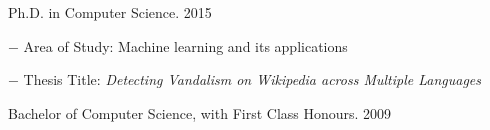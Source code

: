 \documentclass[10pt]{article}
\newcommand{\halfblankline}{\quad\vspace{-0.5\baselineskip}\pagebreak[3]}
\begin{document}
\begin{outerlist}
\item Ph.D. in Computer Science. \hfill 2015
	\begin{innerlist}
		\item[$-$] Area of Study: Machine learning and its applications
		\item[$-$] Thesis Title: \emph{Detecting Vandalism on Wikipedia across Multiple Languages}
		
		
	\end{innerlist}

\item Bachelor of Computer Science, with First Class Honours. \hfill 2009
\end{outerlist}
\end{document}
